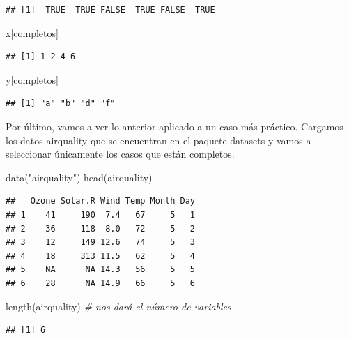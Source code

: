 \documentclass[
]{book}
\newenvironment{Shaded}{\begin{snugshade}}{\end{snugshade}}
\newcommand{\CommentTok}[1]{\textcolor[rgb]{0.56,0.35,0.01}{\textit{#1}}}
\newcommand{\FunctionTok}[1]{\textcolor[rgb]{0.00,0.00,0.00}{#1}}
\newcommand{\NormalTok}[1]{#1}
\newcommand{\StringTok}[1]{\textcolor[rgb]{0.31,0.60,0.02}{#1}}
\begin{document}
\begin{verbatim}
## [1]  TRUE  TRUE FALSE  TRUE FALSE  TRUE
\end{verbatim}

\begin{Shaded}
\begin{Highlighting}[]
\NormalTok{x[completos]}
\end{Highlighting}
\end{Shaded}

\begin{verbatim}
## [1] 1 2 4 6
\end{verbatim}

\begin{Shaded}
\begin{Highlighting}[]
\NormalTok{y[completos]}
\end{Highlighting}
\end{Shaded}

\begin{verbatim}
## [1] "a" "b" "d" "f"
\end{verbatim}

Por último, vamos a ver lo anterior aplicado a un caso más práctico. Cargamos los datos airquality que se encuentran en el paquete datasets y vamos a seleccionar únicamente los casos que están completos.

\begin{Shaded}
\begin{Highlighting}[]
\FunctionTok{data}\NormalTok{(}\StringTok{"airquality"}\NormalTok{)}
\FunctionTok{head}\NormalTok{(airquality)}
\end{Highlighting}
\end{Shaded}

\begin{verbatim}
##   Ozone Solar.R Wind Temp Month Day
## 1    41     190  7.4   67     5   1
## 2    36     118  8.0   72     5   2
## 3    12     149 12.6   74     5   3
## 4    18     313 11.5   62     5   4
## 5    NA      NA 14.3   56     5   5
## 6    28      NA 14.9   66     5   6
\end{verbatim}

\begin{Shaded}
\begin{Highlighting}[]
\FunctionTok{length}\NormalTok{(airquality) }\CommentTok{\# nos dará el número de variables}
\end{Highlighting}
\end{Shaded}

\begin{verbatim}
## [1] 6
\end{verbatim}
\end{document}

